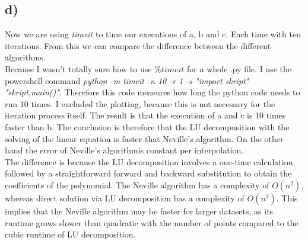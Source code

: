 \subsection*{d)}
Now we are using \textit{timeit} to time our executions of a, b and c. Each time with ten iterations. From this we can compare the difference between the different algorithms. \\
Because I wasn't totally sure how to use $\% timeit$ for a whole .py file. I use the powershell command \textit{python -m timeit -n 10 -r 1 -s "import skript" "skript.main()"}. Therefore this code measures how long the python code needs to run 10 times. 
I excluded the plotting, because this is not necessary for the iteration process itself. The result is that the execution of a and c is 10 times faster than b. 
The conclusion is therefore that the LU decompusition with the solving of the linear equation is faster that Neville's algorithm. On the other hand the error of Neville's algorithmis constant per interpolation.  \\
The difference is because the LU decomposition involves a one-time calculation followed by a straightforward forward and backward substitution to obtain the coefficients of the polynomial. The Neville algorithm has a complexity of $O(n^2)$, whereas direct solution via LU decomposition has a complexity of $O(n^3)$. This implies that the Neville algorithm may be faster for larger datasets, as its runtime grows slower than quadratic with the number of points compared to the cubic runtime of LU decomposition.